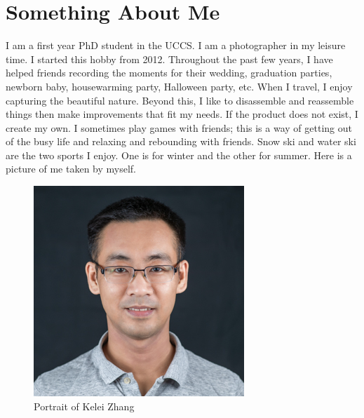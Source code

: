 \section{Something About Me}
I am a first year PhD student in the UCCS. I am a photographer in my leisure time. I started this hobby from 2012. Throughout the past few years, I have helped friends recording the moments for their wedding, graduation parties, newborn baby, housewarming party, Halloween party, etc. When I travel, I enjoy capturing the beautiful nature. Beyond this, I like to disassemble and reassemble things then make improvements that fit my needs. If the product does not exist, I create my own. I sometimes play games with friends; this is a way of getting out of the busy life and relaxing and rebounding with friends. Snow ski and water ski are the two sports I enjoy. One is for winter and the other for summer. Here is a picture of me taken by myself.

\begin{figure}[htbp]
\centerline{\includegraphics{zhang.jpg}}
\caption{Portrait of Kelei Zhang}
\label{fig}
\end{figure}
